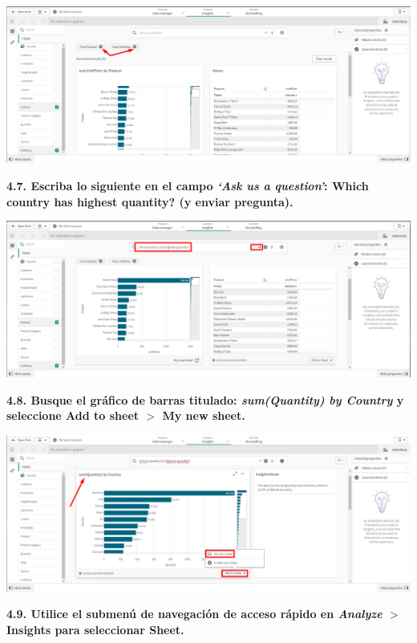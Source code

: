 \documentclass{article}
\begin{document}
    \begin{center}
		\includegraphics[width=14cm]{./images/10.2} 
	\end{center}
	
\textbf{4.7. Escriba lo siguiente en el
 campo \textit{‘Ask us a question’}: 
\textbf{Which country has highest quantity?} (y enviar pregunta).}

    \begin{center}
		\includegraphics[width=14cm]{./images/11} 
	\end{center}
\newpage
\textbf{4.8. Busque el gráfico de barras
 titulado: \textit{sum(Quantity) by Country} y seleccione 
\textbf{Add to sheet} $>$ \textbf{My new sheet}.}

    \begin{center}
		\includegraphics[width=14cm]{./images/11.1} 
	\end{center}
	
\textbf{4.9. Utilice el submenú de navegación 
de acceso rápido en \textit{Analyze} $>$ \textbf{Insights}
 para seleccionar \textbf{Sheet}.}
\end{document}
